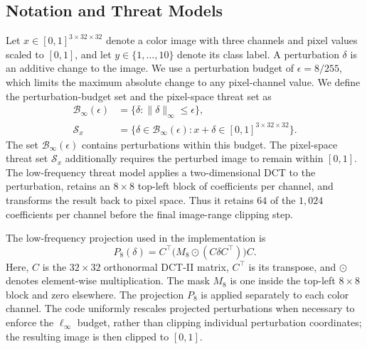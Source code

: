 \documentclass{article}
\newcommand{\linf}{\ell_\infty}
\begin{document}
\subsection{Notation and Threat Models}
Let $x\in[0,1]^{3\times32\times32}$ denote a color image with three channels
and pixel values scaled to $[0,1]$, and let $y\in\{1,\ldots,10\}$ denote its
class label. A perturbation $\delta$ is an additive change to the image. We
use a perturbation budget of $\epsilon=8/255$, which limits the maximum
absolute change to any pixel-channel value.
We define the perturbation-budget set and the pixel-space threat set as
\[
\begin{aligned}
\mathcal{B}_\infty(\epsilon)
  &=\{\delta:\lVert\delta\rVert_\infty\leq\epsilon\},\\
\mathcal{S}_x
  &=\{\delta\in\mathcal{B}_\infty(\epsilon):
      x+\delta\in[0,1]^{3\times32\times32}\}.
\end{aligned}
\]
The set $\mathcal{B}_\infty(\epsilon)$ contains perturbations within this
budget. The pixel-space threat set $\mathcal{S}_x$ additionally requires the
perturbed image to remain within $[0,1]$.
The low-frequency threat model
applies a two-dimensional DCT to the perturbation, retains an $8\times8$
top-left block of coefficients per channel, and transforms the result back to
pixel space. Thus it retains $64$ of the $1{,}024$ coefficients per channel
before the final image-range clipping step.

The low-frequency projection used in the implementation is
\begin{equation}
  P_8(\delta)=C^\top\bigl(M_8\odot(C\delta C^\top)\bigr)C.
  \label{eq:dct-projection}
\end{equation}
Here, $C$ is the $32\times32$ orthonormal DCT-II matrix, $C^\top$ is its
transpose, and $\odot$ denotes element-wise multiplication. The mask $M_8$
is one inside the top-left $8\times8$ block and zero elsewhere. The
projection $P_8$ is applied separately to each color channel.
The code uniformly rescales projected perturbations when necessary to enforce
the $\linf$ budget, rather than clipping individual perturbation coordinates;
the resulting image is then clipped to $[0,1]$.
\end{document}
